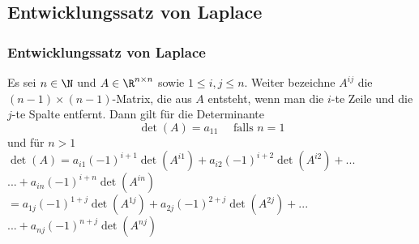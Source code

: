 \subsection{Entwicklungssatz von Laplace}
%
\begin{frame}\frametitle{Entwicklungssatz von Laplace}
Es sei $n \in \N$ und  $A \in \R^{n\times n}$ sowie $1\le i,j \le n$. Weiter bezeichne $A^{ij}$ die $(n-1)\times(n-1)$-Matrix, die aus $A$ entsteht, wenn man die $i$-te Zeile und die $j$-te Spalte entfernt. Dann gilt für die Determinante\pause
$$\det(A)=a_{11} \quad \text{ falls } n=1$$ \pause
und für $n>1$
\vfill
$\det(A)=a_{i1}(-1)^{i+1}\det(A^{i1})+a_{i2}(-1)^{i+2}\det(A^{i2})+...$\\ \vspace{1mm}
\hspace{21mm}$...+a_{in}(-1)^{i+n}\det(A^{in})$\\\vspace{3mm}\pause
\hspace{11.5mm}$=a_{1j}(-1)^{1+j}\det(A^{1j})+a_{2j}(-1)^{2+j}\det(A^{2j})+...$\\ \vspace{1mm}
\hspace{21mm}$...+a_{nj}(-1)^{n+j}\det(A^{nj})$\\\vspace{3mm}
\end{frame}
%
